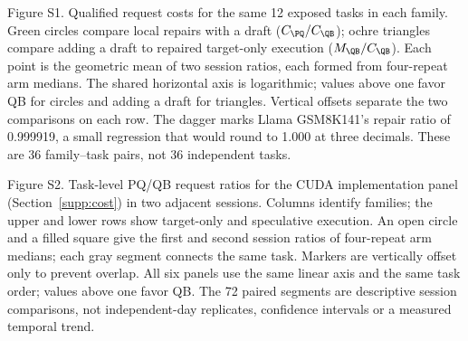 Figure S1. Qualified request costs for the same 12 exposed tasks in each family. Green circles compare local repairs with a draft ($C_{\PQ}/C_{\QB}$); ochre triangles compare adding a draft to repaired target-only execution ($M_{\QB}/C_{\QB}$). Each point is the geometric mean of two session ratios, each formed from four-repeat arm medians. The shared horizontal axis is logarithmic; values above one favor QB for circles and adding a draft for triangles. Vertical offsets separate the two comparisons on each row. The dagger marks Llama GSM8K141's repair ratio of 0.999919, a small regression that would round to 1.000 at three decimals. These are 36 family--task pairs, not 36 independent tasks.

Figure S2. Task-level PQ/QB request ratios for the CUDA implementation panel (Section~\ref{supp:cost}) in two adjacent sessions. Columns identify families; the upper and lower rows show target-only and speculative execution. An open circle and a filled square give the first and second session ratios of four-repeat arm medians; each gray segment connects the same task. Markers are vertically offset only to prevent overlap. All six panels use the same linear axis and the same task order; values above one favor QB. The 72 paired segments are descriptive session comparisons, not independent-day replicates, confidence intervals or a measured temporal trend.
